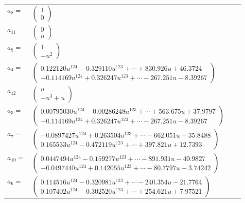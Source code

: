 \documentclass[1p]{elsarticle_modified}
\theoremstyle{definition}
\begin{document}
\begin{tabular}{m{7pt} m{180pt} m{7pt} m{180pt} }
\flushright $a_{8}=$&$\begin{pmatrix}1\\0\end{pmatrix}$ \\
\flushright $a_{11}=$&$\begin{pmatrix}0\\u\end{pmatrix}$ \\
\flushright $a_{9}=$&$\begin{pmatrix}1\\- u^2\end{pmatrix}$ \\
\flushright $a_{4}=$&$\begin{pmatrix}0.122120 u^{124}-0.329110 u^{123}+\cdots+830.926 u+46.3724\\-0.114169 u^{124}+0.326247 u^{123}+\cdots-267.251 u-8.39267\end{pmatrix}$ \\
\flushright $a_{12}=$&$\begin{pmatrix}u\\- u^3+u\end{pmatrix}$ \\
\flushright $a_{3}=$&$\begin{pmatrix}0.00795030 u^{124}-0.00286248 u^{123}+\cdots+563.675 u+37.9797\\-0.114169 u^{124}+0.326247 u^{123}+\cdots-267.251 u-8.39267\end{pmatrix}$ \\
\flushright $a_{7}=$&$\begin{pmatrix}-0.0897427 u^{124}+0.263504 u^{123}+\cdots-662.051 u-35.8488\\0.165533 u^{124}-0.472119 u^{123}+\cdots+397.821 u+12.7393\end{pmatrix}$ \\
\flushright $a_{10}=$&$\begin{pmatrix}0.0447494 u^{124}-0.159277 u^{123}+\cdots-891.931 u-40.9827\\-0.0497440 u^{124}+0.142055 u^{123}+\cdots-80.7797 u-3.74242\end{pmatrix}$ \\
\flushright $a_{6}=$&$\begin{pmatrix}0.114516 u^{124}-0.320981 u^{123}+\cdots-240.354 u-21.7764\\0.107402 u^{124}-0.302520 u^{123}+\cdots+254.621 u+7.97521\end{pmatrix}$ \\

\end{tabular}
\end{document}

